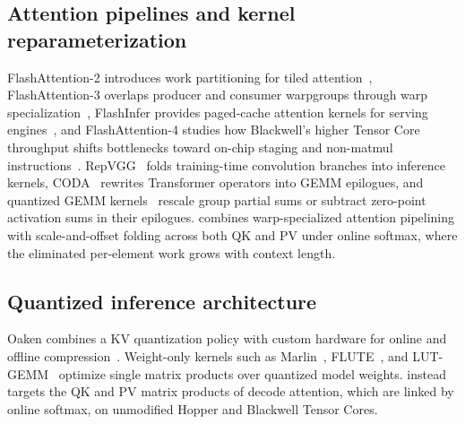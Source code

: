 \subsection{Attention pipelines and kernel reparameterization}

FlashAttention-2 introduces work partitioning for tiled attention~\cite{dao2024flashattention2}, FlashAttention-3 overlaps producer and consumer warpgroups through warp specialization~\cite{shah2024flashattention3}, FlashInfer provides paged-cache attention kernels for serving engines~\cite{ye2025flashinfer}, and FlashAttention-4 studies how Blackwell's higher Tensor Core throughput shifts bottlenecks toward on-chip staging and non-matmul instructions~\cite{zadouri2026flashattention4}.
RepVGG~\cite{ding2021repvgg} folds training-time convolution branches into inference kernels, CODA~\cite{guo2026coda} rewrites Transformer operators into GEMM epilogues, and quantized GEMM kernels~\cite{zhao2024atom,lin2025qserve} rescale group partial sums or subtract zero-point activation sums in their epilogues.
\sys{} combines warp-specialized attention pipelining with scale-and-offset folding across both QK and PV under online softmax, where the eliminated per-element work grows with context length.

\subsection{Quantized inference architecture}

Oaken combines a KV quantization policy with custom hardware for online and offline compression~\cite{kim2025oaken}.
Weight-only kernels such as Marlin~\cite{frantar2025marlin,lin2025marlinw4a8}, FLUTE~\cite{guo2024flute}, and LUT-GEMM~\cite{park2024lutgemm} optimize single matrix products over quantized model weights.
\sys{} instead targets the QK and PV matrix products of decode attention, which are linked by online softmax, on unmodified Hopper and Blackwell Tensor Cores.
